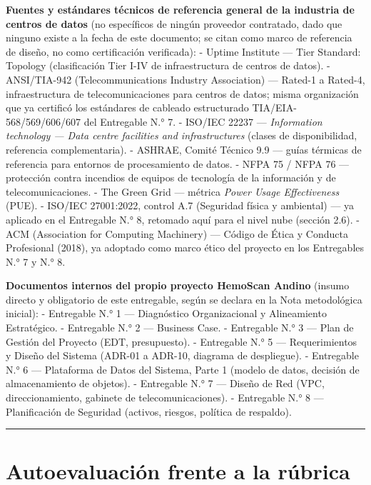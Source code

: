 \documentclass[11pt,a4paper]{article}
\begin{document}
\textbf{Fuentes y estándares técnicos de referencia general de la industria de centros de datos} (no específicos de ningún proveedor contratado, dado que ninguno existe a la fecha de este documento; se citan como marco de referencia de diseño, no como certificación verificada):
- Uptime Institute --- Tier Standard: Topology (clasificación Tier I-IV de infraestructura de centros de datos).
- ANSI/TIA-942 (Telecommunications Industry Association) --- Rated-1 a Rated-4, infraestructura de telecomunicaciones para centros de datos; misma organización que ya certificó los estándares de cableado estructurado TIA/EIA-568/569/606/607 del Entregable N.° 7.
- ISO/IEC 22237 --- \emph{Information technology --- Data centre facilities and infrastructures} (clases de disponibilidad, referencia complementaria).
- ASHRAE, Comité Técnico 9.9 --- guías térmicas de referencia para entornos de procesamiento de datos.
- NFPA 75 / NFPA 76 --- protección contra incendios de equipos de tecnología de la información y de telecomunicaciones.
- The Green Grid --- métrica \emph{Power Usage Effectiveness} (PUE).
- ISO/IEC 27001:2022, control A.7 (Seguridad física y ambiental) --- ya aplicado en el Entregable N.° 8, retomado aquí para el nivel nube (sección 2.6).
- ACM (Association for Computing Machinery) --- Código de Ética y Conducta Profesional (2018), ya adoptado como marco ético del proyecto en los Entregables N.° 7 y N.° 8.

\textbf{Documentos internos del propio proyecto HemoScan Andino} (insumo directo y obligatorio de este entregable, según se declara en la Nota metodológica inicial):
- Entregable N.° 1 --- Diagnóstico Organizacional y Alineamiento Estratégico.
- Entregable N.° 2 --- Business Case.
- Entregable N.° 3 --- Plan de Gestión del Proyecto (EDT, presupuesto).
- Entregable N.° 5 --- Requerimientos y Diseño del Sistema (ADR-01 a ADR-10, diagrama de despliegue).
- Entregable N.° 6 --- Plataforma de Datos del Sistema, Parte 1 (modelo de datos, decisión de almacenamiento de objetos).
- Entregable N.° 7 --- Diseño de Red (VPC, direccionamiento, gabinete de telecomunicaciones).
- Entregable N.° 8 --- Planificación de Seguridad (activos, riesgos, política de respaldo).

\begin{center}\rule{0.5\linewidth}{0.5pt}\end{center}

\section{Autoevaluación frente a la rúbrica}\label{autoevaluaciuxf3n-frente-a-la-ruxfabrica}
\end{document}
